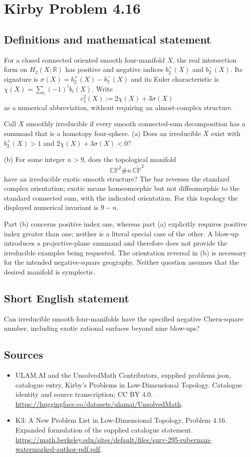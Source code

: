 \documentclass[11pt,a4paper]{article}
\begin{document}
\section*{Kirby Problem 4.16}\label{statement}

\subsection{Definitions and mathematical statement}
For a closed connected oriented smooth four-manifold $X$, the real intersection form on $H_2(X;\mathbb R)$ has positive and negative indices $b_2^+(X)$ and $b_2^-(X)$. Its signature is $\sigma(X)=b_2^+(X)-b_2^-(X)$ and its Euler characteristic is $\chi(X)=\sum_i(-1)^i b_i(X)$. Write
\[
c_1^2(X):=2\chi(X)+3\sigma(X)
\]
as a numerical abbreviation, without requiring an almost-complex structure.

Call $X$ smoothly irreducible if every smooth connected-sum decomposition has a summand that is a homotopy four-sphere. (a) Does an irreducible $X$ exist with $b_2^+(X)>1$ and $2\chi(X)+3\sigma(X)<0$?

(b) For some integer $n>9$, does the topological manifold
\[
\mathbb{CP}^2\#n\,\overline{\mathbb{CP}}^{2}
\]
have an irreducible exotic smooth structure? The bar reverses the standard complex orientation; exotic means homeomorphic but not diffeomorphic to the standard connected sum, with the indicated orientation. For this topology the displayed numerical invariant is $9-n$.

Part (b) concerns positive index one, whereas part (a) explicitly requires positive index greater than one; neither is a literal special case of the other. A blow-up introduces a projective-plane summand and therefore does not provide the irreducible examples being requested. The orientation reversal in (b) is necessary for the intended negative-square geography. Neither question assumes that the desired manifold is symplectic.
\subsection{Short English statement}
Can irreducible smooth four-manifolds have the specified negative Chern-square number, including exotic rational surfaces beyond nine blow-ups?
\subsection{Sources}
\begin{itemize}
\item[S1] ULAM.AI and the UnsolvedMath Contributors, supplied problems.json, catalogue entry, Kirby's Problems in Low-Dimensional Topology. Catalogue identity and source transcription; CC BY 4.0.
\url{https://huggingface.co/datasets/ulamai/UnsolvedMath}.
\item[S2] K3: A New Problem List in Low-Dimensional Topology, Problem 4.16. Expanded formulation of the supplied catalogue statement.
\url{https://math.berkeley.edu/sites/default/files/surv-295-ruberman-watermarked-author-pdf.pdf}.
\end{itemize}
\end{document}
